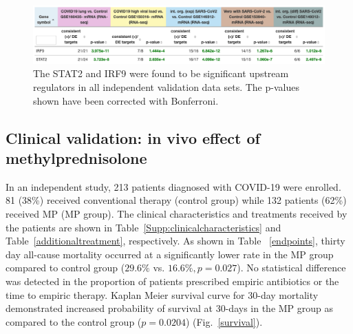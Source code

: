 \begin{figure}
\centering
	\includegraphics[width=1\linewidth]{../Figures/STAT2-IRF9validation.png}
    \caption{The STAT2 and IRF9 were found to be significant upstream regulators in all independent validation data sets. The p-values shown have been corrected with Bonferroni.}
        \label{Supp:STAT2-IRF9validation}
\end{figure}

\subsection{Clinical validation: in vivo effect of methylprednisolone}

In an independent study, 213 patients diagnosed with COVID-19 were enrolled. 81 (38\%) received conventional therapy (control group) while 132 patients (62\%) received MP (MP group). The clinical characteristics and treatments received by the patients are shown in Table~\ref{Supp:clinicalcharacteristics} and Table~\ref{additionaltreatment}, respectively. As shown in Table ~\ref{endpoints}, thirty day all-cause mortality occurred at a significantly lower rate in the MP group compared to control group ($29.6\%$ vs. $16.6\%, p=0.027$). No statistical difference was detected in the proportion of patients prescribed empiric antibiotics or the time to empiric therapy. Kaplan Meier survival curve for 30-day mortality demonstrated increased probability of survival at 30-days in the MP group as compared to the control group ($p= 0.0204$) (Fig.~\ref{survival}).



